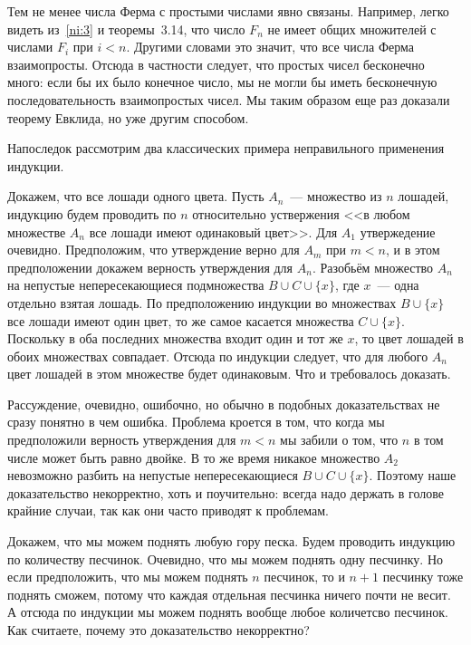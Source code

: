 Тем не менее числа Ферма с простыми числами явно связаны. Например, легко видеть из~\eqref{ni:3} и теоремы~3.14, что число $F_n$ не имеет общих множителей с числами $F_i$ при $i<n$. Другими словами это значит, что все числа Ферма взаимопросты. Отсюда в частности следует, что простых чисел бесконечно много: если бы их было конечное число, мы не могли бы иметь бесконечную последовательность взаимопростых чисел. Мы таким образом еще раз доказали теорему Евклида, но уже другим способом.

Напоследок рассмотрим два классических примера неправильного применения индукции.

\begin{example}
Докажем, что все лошади одного цвета. Пусть $A_n$~--- множество из $n$ лошадей, индукцию будем проводить по $n$ относительно уствержения <<в любом множестве $A_n$ все лошади имеют одинаковый цвет>>. Для $A_1$ утвержедение очевидно. Предположим, что утверждение верно для $A_m$ при $m<n$, и в этом предположении докажем верность утверждения для $A_n$. Разобьём множество $A_n$ на непустые непересекающиеся подмножества $B\cup C \cup\{x\}$, где $x$~--- одна отдельно взятая лошадь. По предположению индукции во множествах $B\cup\{x\}$ все лошади имеют один цвет, то же самое касается множества $C\cup\{x\}$. Поскольку в оба последних множества входит один и тот же $x$, то цвет лошадей в обоих множествах совпадает. Отсюда по индукции следует, что для любого $A_n$ цвет лошадей в этом множестве будет одинаковым. Что и требовалось доказать.
\end{example}

Рассуждение, очевидно, ошибочно, но обычно в подобных доказательствах не сразу понятно в чем ошибка. Проблема кроется в том, что когда мы предположили верность утверждения для $m<n$ мы забили о том, что $n$ в том числе может быть равно двойке. В то же время никакое множество $A_2$ невозможно разбить на непустые непересекающиеся $B\cup C\cup\{x\}$. Поэтому наше доказательство некорректно, хоть и поучительно: всегда надо держать в голове крайние случаи, так как они часто приводят к проблемам.

\begin{exercise}
Докажем, что мы можем поднять любую гору песка. Будем проводить индукцию по количеству песчинок. Очевидно, что мы можем поднять одну песчинку. Но если предположить, что мы можем поднять $n$ песчинок, то и $n+1$ песчинку тоже поднять сможем, потому что каждая отдельная песчинка ничего почти не весит. А отсюда по индукции мы можем поднять вообще любое количетсво песчинок. Как считаете, почему это доказательство некорректно?
\end{exercise}
